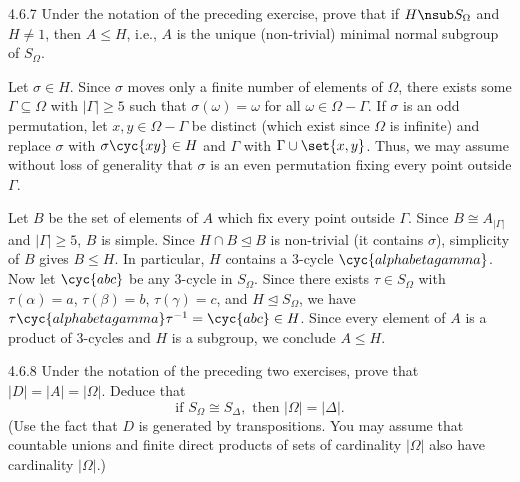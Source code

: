 \begin{exercise}{4.6.7}
	Under the notation of the preceding exercise, prove that if $H \nsub S_\Omega$ and $H \neq 1$, then $A \leq H$, i.e., $A$ is the unique (non-trivial) minimal normal subgroup of $S_\Omega$.
\end{exercise}

\begin{sol}
	Let $\sigma \in H$.
	Since $\sigma$ moves only a finite number of elements of $\Omega$, there exists some $\Gamma \subseteq \Omega$ with $|\Gamma| \geq 5$ such that $\sigma(\omega) = \omega$ for all $\omega \in \Omega - \Gamma$.
	If $\sigma$ is an odd permutation, let $x, y \in \Omega - \Gamma$ be distinct (which exist since $\Omega$ is infinite) and replace $\sigma$ with $\sigma\cyc{x y} \in H$ and $\Gamma$ with $\Gamma \cup \set{x, y}$.
	Thus, we may assume without loss of generality that $\sigma$ is an even permutation fixing every point outside $\Gamma$. 

	Let $B$ be the set of elements of $A$ which fix every point outside $\Gamma$.
	Since $B \cong A_{|\Gamma|}$ and $|\Gamma| \geq 5$, $B$ is simple.
	Since $H \cap B \trianglelefteq B$ is non-trivial (it contains $\sigma$), simplicity of $B$ gives $B \leq H$.
	In particular, $H$ contains a 3-cycle $\cyc{alpha beta gamma}$.
	Now let $\cyc{a b c}$ be any 3-cycle in $S_\Omega$.
	Since there exists $\tau \in S_\Omega$ with $\tau(\alpha) = a$, $\tau(\beta) = b$, $\tau(\gamma) = c$, and $H \trianglelefteq S_\Omega$, we have $\tau\cyc{alpha beta gamma}\tau^{-1} = \cyc{a b c} \in H$.
	Since every element of $A$ is a product of 3-cycles and $H$ is a subgroup, we conclude $A \leq H$.
\end{sol}

\begin{exercise}{4.6.8}
	Under the notation of the preceding two exercises, prove that $|D| = |A| = |\Omega|$.
	Deduce that
	\[
		\text{if }S_\Omega \cong S_\Delta, \text{ then } |\Omega| = |\Delta|.
	\]
	(Use the fact that $D$ is generated by transpositions.
	You may assume that countable unions and finite direct products of sets of cardinality $|\Omega|$ also have cardinality $|\Omega|$.)
\end{exercise}

